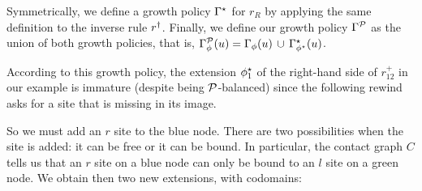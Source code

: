 Symmetrically, we define a growth policy $\Gamma^\star$ for $r_R$
by applying the same definition to the inverse rule $r^\dagger$.
Finally, we define our growth policy $\Gamma^{\mathcal{P}}$
as the union of both growth policies,
that is, $\Gamma^{\mathcal{P}}_\phi(u) = \Gamma_\phi(u)
\,\cup\, \Gamma_{\phi^\star}^\star(u)$.

According to this growth policy,
the extension $\phi_1^\star$
of the right-hand side of $r^+_{12}$
in our example
is immature (despite being $\mathcal{P}$-balanced)
since the following rewind
asks for a site that is missing in its image.

So we must add an $r$ site to the blue node.
There are two possibilities when the site is added:
it can be free or it can be bound.
In particular, the contact graph $C$ tells us
that an $r$ site on a blue node can only be bound
to an $l$ site on a green node.
We obtain then two new extensions,
with codomains:
\begin{center}
\end{center}
